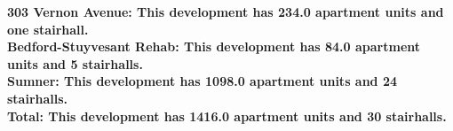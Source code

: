 \bf{303 Vernon Avenue}: This development has 234.0 apartment units and one stairhall.\\\bf{Bedford-Stuyvesant Rehab}: This development has 84.0 apartment units and 5 stairhalls.\\\bf{Sumner}: This development has 1098.0 apartment units and 24 stairhalls.\\\bf{Total}: This development has 1416.0 apartment units and 30 stairhalls.\\